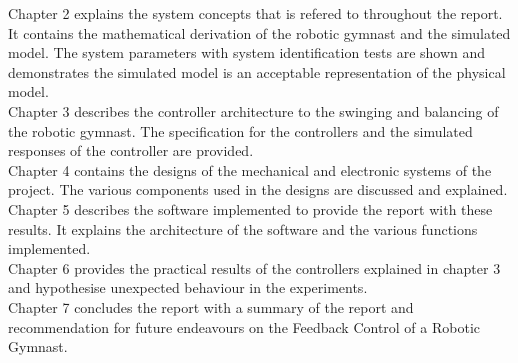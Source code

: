 Chapter 2 explains the system concepts that is refered to throughout the report. It contains the mathematical derivation of the robotic gymnast and the simulated model. The system parameters with system identification tests are shown and demonstrates the simulated model is an acceptable representation of the physical model.\\

Chapter 3 describes the controller architecture to the swinging and balancing of the robotic gymnast. The specification for the controllers and the simulated responses of the controller are provided.\\

Chapter 4 contains the designs of the mechanical and electronic systems of the project. The various components used in the designs are discussed and explained.\\

Chapter 5 describes the software implemented to provide the report with these results. It explains the architecture of the software and the various functions implemented.\\

Chapter 6 provides the practical results of the controllers explained in chapter 3 and hypothesise unexpected behaviour in the experiments.\\

Chapter 7 concludes the report with a summary of the report and recommendation for future endeavours on the Feedback Control of a Robotic Gymnast. 

 
